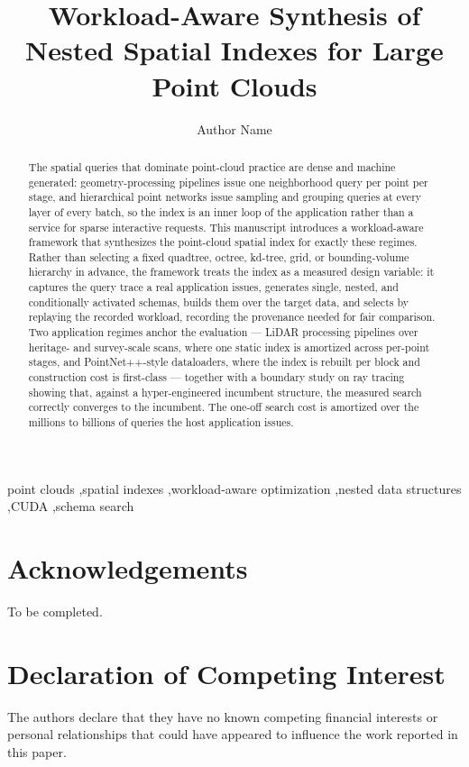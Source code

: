 \documentclass[preprint,12pt]{elsarticle}
\begin{document}
\begin{frontmatter}

\title{Workload-Aware Synthesis of Nested Spatial Indexes for Large Point Clouds}

\author[inst1]{Author Name}

\begin{abstract}
The spatial queries that dominate point-cloud practice are dense and machine generated: geometry-processing pipelines issue one neighborhood query per point per stage, and hierarchical point networks issue sampling and grouping queries at every layer of every batch, so the index is an inner loop of the application rather than a service for sparse interactive requests. This manuscript introduces a workload-aware framework that synthesizes the point-cloud spatial index for exactly these regimes. Rather than selecting a fixed quadtree, octree, kd-tree, grid, or bounding-volume hierarchy in advance, the framework treats the index as a measured design variable: it captures the query trace a real application issues, generates single, nested, and conditionally activated schemas, builds them over the target data, and selects by replaying the recorded workload, recording the provenance needed for fair comparison. Two application regimes anchor the evaluation --- LiDAR processing pipelines over heritage- and survey-scale scans, where one static index is amortized across per-point stages, and PointNet++-style dataloaders, where the index is rebuilt per block and construction cost is first-class --- together with a boundary study on ray tracing showing that, against a hyper-engineered incumbent structure, the measured search correctly converges to the incumbent. The one-off search cost is amortized over the millions to billions of queries the host application issues.
\end{abstract}

\begin{keyword}
point clouds \sep spatial indexes \sep workload-aware optimization \sep nested data structures \sep CUDA \sep schema search
\end{keyword}

\end{frontmatter}







\section*{Acknowledgements}
To be completed.

\section*{Declaration of Competing Interest}
The authors declare that they have no known competing financial interests or personal relationships that could have appeared to influence the work reported in this paper.



\end{document}
